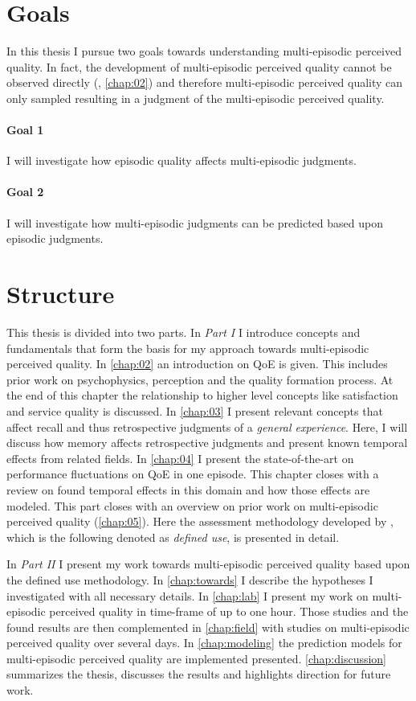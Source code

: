 \section{Goals}
In this thesis I pursue two goals towards understanding multi-episodic perceived quality.
In fact, the development of multi-episodic perceived quality cannot be observed directly (\cf, \autoref{chap:02}) and therefore multi-episodic perceived quality can only sampled resulting in a judgment of the multi-episodic perceived quality.

\paragraph*{Goal 1}
I will investigate how episodic quality affects multi-episodic judgments.

\paragraph*{Goal 2}
I will investigate how multi-episodic judgments can be predicted based upon episodic judgments.

\section{Structure}
This thesis is divided into two parts.
In \emph{Part I} I introduce concepts and fundamentals that form the basis for my approach towards multi-episodic perceived quality.
In \autoref{chap:02} an introduction on \ac{QoE} is given.
This includes prior work on psychophysics, perception and the quality formation process.
At the end of this chapter the relationship to higher level concepts like satisfaction and service quality is discussed.
In \autoref{chap:03} I present relevant concepts that affect recall and thus retrospective judgments of a \emph{general experience}.
Here, I will discuss how memory affects retrospective judgments and present known temporal effects from related fields.
In \autoref{chap:04} I present the state-of-the-art on performance fluctuations on \ac{QoE} in one episode.
This chapter closes with a review on found temporal effects in this domain and how those effects are modeled.
This part closes with an overview on prior work on multi-episodic perceived quality (\autoref{chap:05}).
Here the assessment methodology developed by \cite{moller_single-call_2011}, which is the following denoted as \emph{defined use}, is presented in detail.

In \emph{Part II} I present my work towards multi-episodic perceived quality based upon the defined use methodology.
In \autoref{chap:towards} I describe the hypotheses I investigated with all necessary details.
In \autoref{chap:lab} I present my work on multi-episodic perceived quality in time-frame of up to one hour.
Those studies and the found results are then complemented in \autoref{chap:field} with studies on multi-episodic perceived quality over several days.
In \autoref{chap:modeling} the prediction models for multi-episodic perceived quality are implemented presented.
\autoref{chap:discussion} summarizes the thesis, discusses the results and highlights direction for future work.
